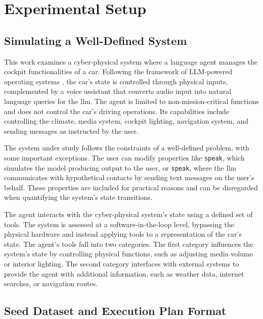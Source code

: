 \section{Experimental Setup}

\subsection{Simulating a Well-Defined System}

This work examines a cyber-physical system where a language agent manages the cockpit functionalities of a car. Following the framework of LLM-powered operating systems \cite{aiasos}, the car's state is controlled through physical inputs, complemented by a voice assistant that converts audio input into natural language queries for the \gls{llm}. The agent is limited to non-mission-critical functions and does not control the car's driving operations. Its capabilities include controlling the climate, media system, cockpit lighting, navigation system, and sending messages as instructed by the user.

\pskip

The system under study follows the constraints of a well-defined problem, with some important exceptions. The user can modify properties like \texttt{speak}, which simulates the model producing output to the user, or \texttt{speak}, where the \gls{llm} communicates with hypothetical contacts by sending text messages on the user's behalf. These properties are included for practical reasons and can be disregarded when quantifying the system's state transitions.



The agent interacts with the cyber-physical system's state using a defined set of tools. The system is assessed at a software-in-the-loop level, bypassing the physical hardware and instead applying tools to a representation of the car's state. The agent's tools fall into two categories. The first category influences the system's state by controlling physical functions, such as adjusting media volume or interior lighting. The second category interfaces with external systems to provide the agent with additional information, such as weather data, internet searches, or navigation routes.

\pskip



\FloatBarrier

\subsection{Seed Dataset and Execution Plan Format}


